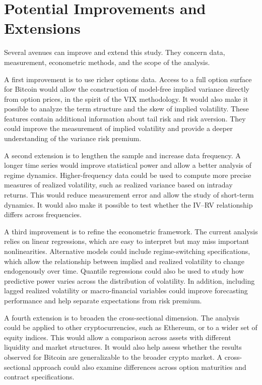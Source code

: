 \documentclass[11pt,a4paper,openany]{report}
\begin{document}
\section{Potential Improvements and
Extensions}\label{potential-improvements-and-extensions}

Several avenues can improve and extend this study. They concern data,
measurement, econometric methods, and the scope of the analysis.

A first improvement is to use richer options data. Access to a full
option surface for Bitcoin would allow the construction of model-free
implied variance directly from option prices, in the spirit of the VIX
methodology. It would also make it possible to analyze the term
structure and the skew of implied volatility. These features contain
additional information about tail risk and risk aversion. They could
improve the measurement of implied volatility and provide a deeper
understanding of the variance risk premium.

A second extension is to lengthen the sample and increase data
frequency. A longer time series would improve statistical power and
allow a better analysis of regime dynamics. Higher-frequency data could
be used to compute more precise measures of realized volatility, such as
realized variance based on intraday returns. This would reduce
measurement error and allow the study of short-term dynamics. It would
also make it possible to test whether the IV--RV relationship differs
across frequencies.

A third improvement is to refine the econometric framework. The current
analysis relies on linear regressions, which are easy to interpret but
may miss important nonlinearities. Alternative models could include
regime-switching specifications, which allow the relationship between
implied and realized volatility to change endogenously over time.
Quantile regressions could also be used to study how predictive power
varies across the distribution of volatility. In addition, including
lagged realized volatility or macro-financial variables could improve
forecasting performance and help separate expectations from risk
premium.

A fourth extension is to broaden the cross-sectional dimension. The
analysis could be applied to other cryptocurrencies, such as Ethereum,
or to a wider set of equity indices. This would allow a comparison
across assets with different liquidity and market structures. It would
also help assess whether the results observed for Bitcoin are
generalizable to the broader crypto market. A cross-sectional approach
could also examine differences across option maturities and contract
specifications.
\end{document}
